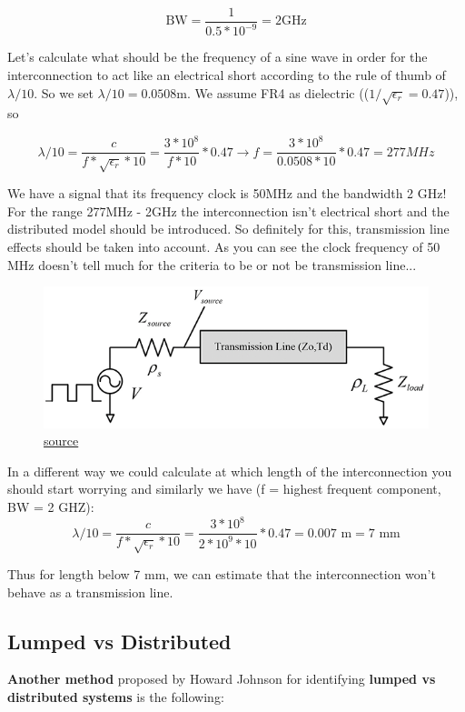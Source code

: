 \documentclass[final]{cubedoc}
\begin{document}
	\[\text{BW} = \frac{1}{0.5 * 10^{-9}} = 2 \text{GHz}\]
	
	Let's calculate what should be the frequency of a sine wave in order for the interconnection to act like an electrical short according to the rule of thumb of $\lambda/10$. So we set $\lambda/10 = 0.0508 \text{m}$. We assume FR4 as dielectric (($1/\sqrt{\epsilon_r} = 0.47$)), so
	
	\[\lambda/10 = \frac{c}{f * \sqrt{\epsilon_r} * 10} = \frac{3 * 10^8}{f * 10} * 0.47 \rightarrow f = \frac{3 * 10^8}{0.0508 * 10} * 0.47 = 277 MHz \]
	
	We have a signal that its frequency clock is 50MHz and the bandwidth 2 GHz! For the range 277MHz - 2GHz the interconnection isn't electrical short and the distributed model should be introduced. So definitely for this, transmission line effects should be taken into account. As you can see the clock frequency of 50 MHz doesn't tell much for the criteria to be or not be transmission line... 
	
	\begin{figure}[h!]
		\centering
		\includegraphics[keepaspectratio, width = \textwidth]{assets/transmission_input.png}
		\caption{\href{https://incompliancemag.com/article/an-overview-of-transmission-lines-in-electronic-systems/}{source}}
	\end{figure}
	
	In a different way we could calculate at which length of the interconnection you should start worrying and similarly we have (f = highest frequent component, BW = 2 GHZ):
	\[\lambda/10 = \frac{c}{f * \sqrt{\epsilon_r} * 10} = \frac{3 * 10^8}{2*10^9 * 10} * 0.47 = 0.007 \text{ m} = 7 \text{ mm} \]
	
	Thus for length below 7 mm, we can estimate that the interconnection won't behave as a transmission line.
	
	\subsection{Lumped vs Distributed}
	\textbf{Another method} proposed by Howard Johnson for identifying \textbf{lumped vs distributed systems} is the following:
	
\end{document}
